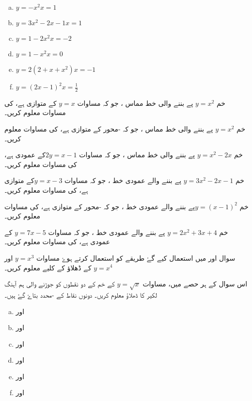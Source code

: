 \begin{multicols}{2}  
\begin{enumerate}[a.]
\item \(y= -x^{2}\)\quad\quad \(x= 1\)
\item \(y=3x^{2} -2x -1 \)\quad\quad \(x=1\)
\item \(y=1-2x^{2}\)\quad\quad \(x=-2\) 
\item \(y=1-x^{2}\)\quad\quad \(x=0\) 
\item \(y=2(2+x+x^{2})\)\quad\quad \(x=-1\) 
\item \(y=(2x-1)^{2}\)\quad\quad \(x= \frac{1}{2}\)
\end{enumerate}
  \end{multicols}
خم \(y=x^{2}\) پے بننے والی خط مماس ، جو کہ مساوات \(y=x\) کے متوازی ہے، کی مساوات معلوم کریں۔

خم \(y=x^{2}\) پے بننے والی خط مماس ، جو کہ -محور کے متوازی ہے، کی مساوات معلوم کریں۔
 
خم \(y=x^{2} -2x\) پے بننے والی خط مماس ، جو کہ مساوات  \(2y=x-1\)کے  عمودی ہے، کی مساوات معلوم کریں۔

خم \(y=3x^{2} -2x -1\) پے بننے والے عمودی خط  ، جو کہ مساوات  \(y=x-3\)کے  متوازی ہے، کی مساوات معلوم کریں۔

خم \(y=(x-1)^{2}\)پے بننے والے عمودی خط  ، جو کہ -محور    کے  متوازی ہے، کی مساوات معلوم کریں۔

خم \(y=2x^{2} +3x +4\) پے بننے والے عمودی خط  ، جو کہ مساوات \(y=7x-5\)  کے  عمودی ہے، کی مساوات معلوم کریں۔

سوال  اور  میں استعمال کیے گۓ طریقے کو استعمال کرتے ہوۓ مساوات  \(y=x^3\) اور \(y=x^4\) کے ڈھلاؤ کے کلیے معلوم کریں۔

  اس سوال کے ہر حصے میں، مساوات \(y=\sqrt{x}\) کے خم کے دو نقطوں کو جوڑنے والی ہم آہنگ لکیر کا ڈھلاؤ معلوم کریں۔ دونوں نقاط کے  -محدد بتاۓ گۓ ہیں۔ 
\begin{multicols}{3}     
\begin{enumerate}[a.]
\item
    اور     
\item
{}  اور     
\item
{}  اور     
\item
{}  اور     
\item
{}  اور     
\item
{}  اور     
\end{enumerate}
 \end{multicols}

